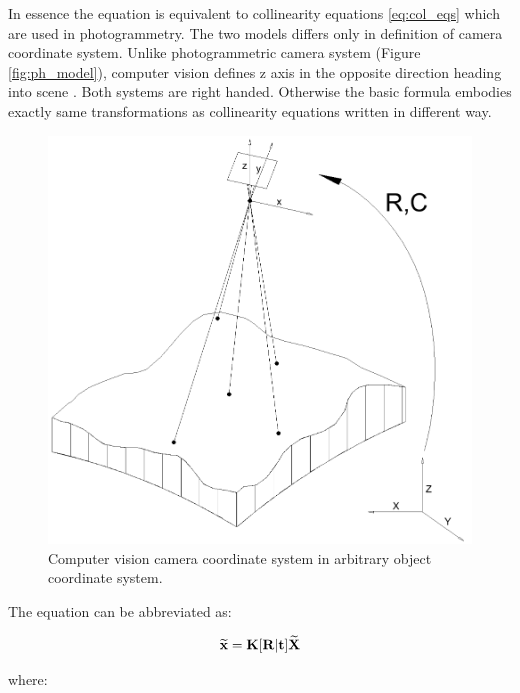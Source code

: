 \documentclass[a4paper,12pt]{article}
\newcommand{\ematr}[1]{
{\bf #1}
}
\newcommand{\evect}[1]{
{\bf #1}
}
\newcommand{\ehvect}[1]{
{\bf \widetilde{#1}}
}
\begin{document}
In essence the equation is equivalent to collinearity equations \eqref{eq:col_eqs} which are used in photogrammetry.
The two models differs only in definition of camera coordinate system.
Unlike photogrammetric camera system (Figure \ref{fig:ph_model}), computer vision defines z axis in the opposite direction heading into scene \cite[p. 156]{Hartley2004}.
Both systems are right handed.
Otherwise the basic formula embodies exactly same transformations as collinearity equations written in different way.

\begin{figure}[h]
    \centering
    \includegraphics[scale=0.3]{figures/photogrammetric_model.png}
    \caption{Computer vision camera coordinate system in arbitrary object coordinate system.}
    \label{fig:cv_model}
\end{figure}

The equation can be abbreviated as:

\begin{equation}
\label{eq:p_exp}
\ehvect{x} = \ematr{K} \ematr{[}\ematr{R}|\evect{t}\ematr{]} \ehvect{X}
\end{equation}

where:
\end{document}
